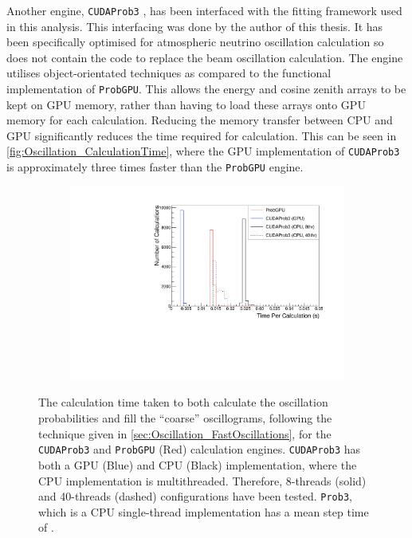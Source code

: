 Another engine, \texttt{CUDAProb3} \cite{cudaprob3}, has been interfaced with the fitting framework used in this analysis. This interfacing was done by the author of this thesis. It has been specifically optimised for atmospheric neutrino oscillation calculation so does not contain the code to replace the beam oscillation calculation. The engine utilises object-orientated techniques as compared to the functional implementation of \texttt{ProbGPU}. This allows the energy and cosine zenith arrays to be kept on GPU memory, rather than having to load these arrays onto GPU memory for each calculation. Reducing the memory transfer between CPU and GPU significantly reduces the time required for calculation. This can be seen in \autoref{fig:Oscillation_CalculationTime}, where the GPU implementation of \texttt{CUDAProb3} is approximately three times faster than the \texttt{ProbGPU} engine. 

\begin{figure}[h]
  \begin{subfigure}[t]{0.8\textwidth}
    \includegraphics[width=\textwidth, trim={0mm 0mm 0mm 0mm}, clip,page=1]{Figures/Oscillation/CalculationTime.pdf}
  \end{subfigure}
  \caption{The calculation time taken to both calculate the oscillation probabilities and fill the ``coarse'' oscillograms, following the technique given in \autoref{sec:Oscillation_FastOscillations},  for the \texttt{CUDAProb3} and \texttt{ProbGPU} (Red) calculation engines. \texttt{CUDAProb3} has both a GPU (Blue) and CPU (Black) implementation, where the CPU implementation is multithreaded. Therefore, 8-threads (solid) and 40-threads (dashed) configurations have been tested. \texttt{Prob3}, which is a CPU single-thread implementation has a mean step time of .}
  \label{fig:Oscillation_CalculationTime}
\end{figure}

